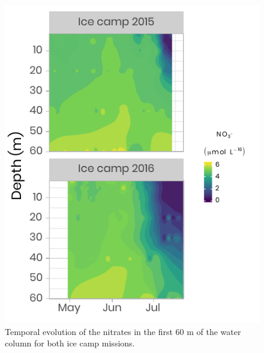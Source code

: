 \documentclass[12pt,a4paper]{scrartcl}
\begin{document}
\begin{figure}[h]
	\centering
	\includegraphics[scale = 2]{../../../graphs/fig7.pdf}
	\caption{Temporal evolution of the nitrates in the first 60 m of the water column for both ice camp missions.}
\end{figure}

\clearpage
\newpage
\end{document}
